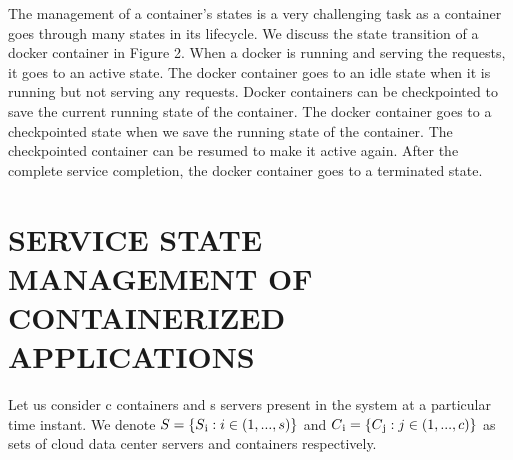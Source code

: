 \documentclass[conference]{IEEEtran}
\begin{document}
The management of a container’s states is a very challenging
task as a container goes through many states in its lifecycle. We discuss the state transition of a docker container in
Figure 2. When a docker is running and serving the requests,
it goes to an active state. The docker container goes to an
idle state when it is running but not serving any requests.
Docker containers can be checkpointed to save the current
running state of the container. The docker container goes to
a checkpointed state when we save the running state of the
container. The checkpointed container can be resumed to make
it active again. After the complete service completion, the
docker container goes to a terminated state.

\section{ SERVICE STATE MANAGEMENT OF CONTAINERIZED
APPLICATIONS}
Let us consider c containers and s servers present in the
system at a particular time instant. We denote \begin{math} S = \{ S\textsubscript{i} :   i \in (1,...,s) \} \end{math} and \begin{math} C\textsubscript{i} = \{C\textsubscript{j} : j \in (1,...,c)\}\end{math} as sets of cloud
data center servers and containers respectively.
\end{document}
